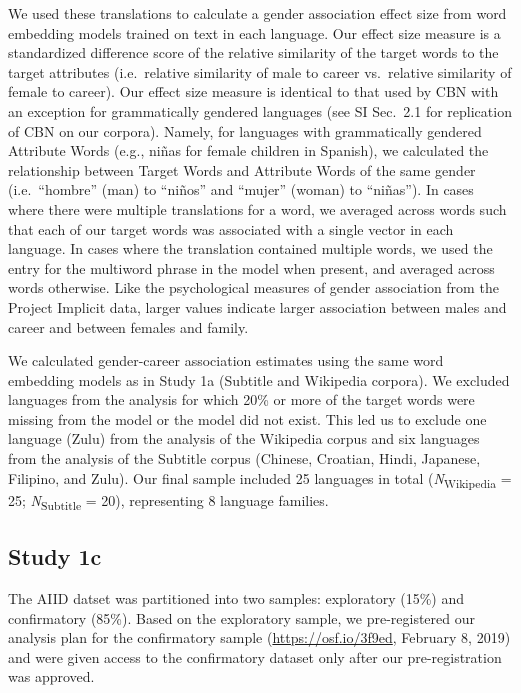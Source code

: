 \documentclass[9pt,twocolumn]{pnas-new}
\begin{document}
We used these translations to calculate a gender association effect size from
word embedding models trained on text in each language. Our effect size
measure is a standardized difference score of the relative similarity of
the target words to the target attributes (i.e.~relative similarity of
male to career vs.~relative similarity of female to career). Our effect
size measure is identical to that used by CBN with an exception for
grammatically gendered languages (see SI Sec.\ 2.1 for replication of CBN on our
corpora). Namely, for languages with grammatically gendered Attribute
Words (e.g., niñas for female children in Spanish), we calculated the
relationship between Target Words and Attribute Words of the same gender
(i.e.~\enquote{hombre} (man) to \enquote{niños} and \enquote{mujer}
(woman) to \enquote{niñas}). In cases where there were multiple
translations for a word, we averaged across words such that each of our
target words was associated with a single vector in each language. In
cases where the translation contained multiple words, we used the entry
for the multiword phrase in the model when present, and averaged across
words otherwise. Like the psychological measures of gender association from the
Project Implicit data, larger values indicate larger association between males and career and between females and family.

We calculated gender-career association estimates using the same word embedding models
as in Study 1a (Subtitle and Wikipedia corpora). We excluded languages
from the analysis for which 20\% or more of the target words were
missing from the model or the model did not exist. This led us to
exclude one language (Zulu) from the analysis of the Wikipedia corpus
and six languages from the analysis of the Subtitle corpus (Chinese,
Croatian, Hindi, Japanese, Filipino, and Zulu). Our final sample
included 25 languages in total (\emph{N}\textsubscript{Wikipedia} = 25;
\emph{N}\textsubscript{Subtitle} = 20), representing 8 language
families. 


\subsection*{Study 1c}

The AIID datset was partitioned into two samples: exploratory (15\%) and
confirmatory (85\%). Based on the exploratory sample, we pre-registered
our analysis plan for the confirmatory sample
(\url{https://osf.io/3f9ed}, February 8, 2019) and were given access to the confirmatory dataset only after our pre-registration was approved. 
\end{document}
